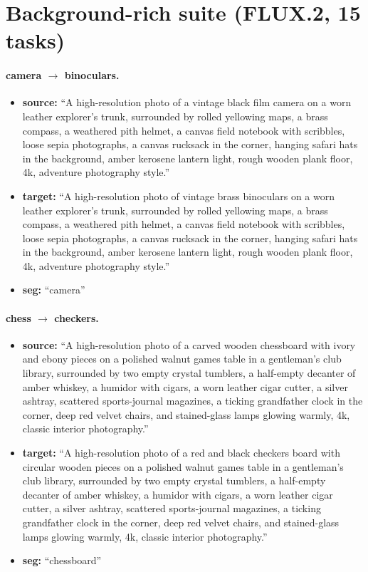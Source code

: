 \section*{Background-rich suite (FLUX.2, 15 tasks)}

\paragraph{camera $\to$ binoculars.}
\begin{itemize}
    \item \textbf{source:} ``A high-resolution photo of a vintage black film camera on a worn leather explorer's trunk, surrounded by rolled yellowing maps, a brass compass, a weathered pith helmet, a canvas field notebook with scribbles, loose sepia photographs, a canvas rucksack in the corner, hanging safari hats in the background, amber kerosene lantern light, rough wooden plank floor, 4k, adventure photography style.''
    \item \textbf{target:} ``A high-resolution photo of vintage brass binoculars on a worn leather explorer's trunk, surrounded by rolled yellowing maps, a brass compass, a weathered pith helmet, a canvas field notebook with scribbles, loose sepia photographs, a canvas rucksack in the corner, hanging safari hats in the background, amber kerosene lantern light, rough wooden plank floor, 4k, adventure photography style.''
    \item \textbf{seg:} ``camera''
\end{itemize}

\paragraph{chess $\to$ checkers.}
\begin{itemize}
    \item \textbf{source:} ``A high-resolution photo of a carved wooden chessboard with ivory and ebony pieces on a polished walnut games table in a gentleman's club library, surrounded by two empty crystal tumblers, a half-empty decanter of amber whiskey, a humidor with cigars, a worn leather cigar cutter, a silver ashtray, scattered sports-journal magazines, a ticking grandfather clock in the corner, deep red velvet chairs, and stained-glass lamps glowing warmly, 4k, classic interior photography.''
    \item \textbf{target:} ``A high-resolution photo of a red and black checkers board with circular wooden pieces on a polished walnut games table in a gentleman's club library, surrounded by two empty crystal tumblers, a half-empty decanter of amber whiskey, a humidor with cigars, a worn leather cigar cutter, a silver ashtray, scattered sports-journal magazines, a ticking grandfather clock in the corner, deep red velvet chairs, and stained-glass lamps glowing warmly, 4k, classic interior photography.''
    \item \textbf{seg:} ``chessboard''
\end{itemize}

